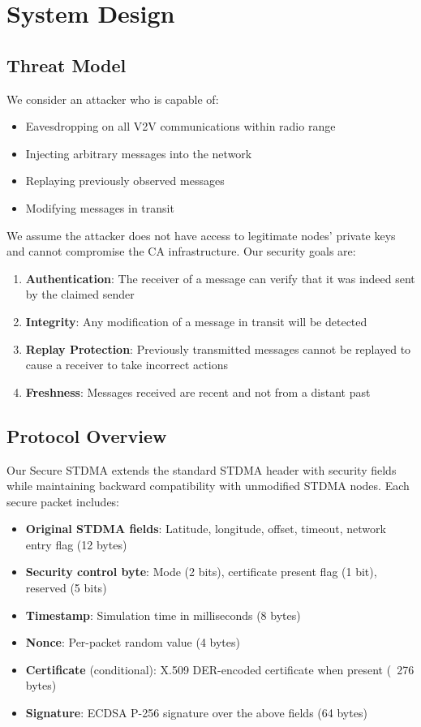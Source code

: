 \documentclass[conference]{IEEEtran}
\begin{document}
\section{System Design}
\label{sec:system}

\subsection{Threat Model}

We consider an attacker who is capable of:
\begin{itemize}
    \item Eavesdropping on all V2V communications within radio range
    \item Injecting arbitrary messages into the network
    \item Replaying previously observed messages
    \item Modifying messages in transit
\end{itemize}

We assume the attacker does not have access to legitimate nodes' private keys and cannot compromise the CA infrastructure. Our security goals are:

\begin{enumerate}
    \item \textbf{Authentication}: The receiver of a message can verify that it was indeed sent by the claimed sender
    \item \textbf{Integrity}: Any modification of a message in transit will be detected
    \item \textbf{Replay Protection}: Previously transmitted messages cannot be replayed to cause a receiver to take incorrect actions
    \item \textbf{Freshness}: Messages received are recent and not from a distant past
\end{enumerate}

\subsection{Protocol Overview}

Our Secure STDMA extends the standard STDMA header with security fields while maintaining backward compatibility with unmodified STDMA nodes. Each secure packet includes:

\begin{itemize}
    \item \textbf{Original STDMA fields}: Latitude, longitude, offset, timeout, network entry flag (12 bytes)
    \item \textbf{Security control byte}: Mode (2 bits), certificate present flag (1 bit), reserved (5 bits)
    \item \textbf{Timestamp}: Simulation time in milliseconds (8 bytes)
    \item \textbf{Nonce}: Per-packet random value (4 bytes)
    \item \textbf{Certificate} (conditional): X.509 DER-encoded certificate when present (~276 bytes)
    \item \textbf{Signature}: ECDSA P-256 signature over the above fields (64 bytes)
\end{itemize}
\end{document}
